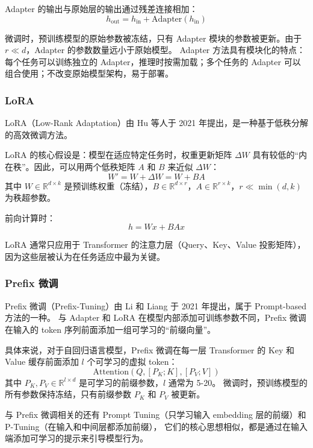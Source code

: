 Adapter 的输出与原始层的输出通过残差连接相加：
\begin{equation*}
	h_{\text{out}} = h_{\text{in}} + \text{Adapter}(h_{\text{in}})
\end{equation*}

微调时，预训练模型的原始参数被冻结，只有 Adapter 模块的参数被更新。由于 $r \ll d$，Adapter 的参数数量远小于原始模型。
Adapter 方法具有模块化的特点：每个任务可以训练独立的 Adapter，推理时按需加载；多个任务的 Adapter 可以组合使用；不改变原始模型架构，易于部署。

\subsubsection{LoRA}
LoRA（Low-Rank Adaptation）由 Hu 等人于 2021 年提出，是一种基于低秩分解的高效微调方法。

LoRA 的核心假设是：模型在适应特定任务时，权重更新矩阵 $\Delta W$ 具有较低的“内在秩”。因此，可以用两个低秩矩阵 $A$ 和 $B$ 来近似 $\Delta W$：
\begin{equation*}
	W' = W + \Delta W = W + BA
\end{equation*}
其中 $W \in \mathbb{R}^{d \times k}$ 是预训练权重（冻结），$B \in \mathbb{R}^{d \times r}$，$A \in \mathbb{R}^{r \times k}$，$r \ll \min(d, k)$ 为秩超参数。

前向计算时：
\begin{equation*}
	h = Wx + BAx
\end{equation*}

LoRA 通常只应用于 Transformer 的注意力层（Query、Key、Value 投影矩阵），因为这些层被认为在任务适应中最为关键。

\subsubsection{Prefix 微调}
Prefix 微调（Prefix-Tuning）由 Li 和 Liang 于 2021 年提出，属于 Prompt-based 方法的一种。
与 Adapter 和 LoRA 在模型内部添加可训练参数不同，Prefix 微调在输入的 token 序列前面添加一组可学习的“前缀向量”。

具体来说，对于自回归语言模型，Prefix 微调在每一层 Transformer 的 Key 和 Value 缓存前面添加 $l$ 个可学习的虚拟 token：
\begin{equation*}
	\text{Attention}(Q, [P_K; K], [P_V; V])
\end{equation*}
其中 $P_K, P_V \in \mathbb{R}^{l \times d}$ 是可学习的前缀参数，$l$ 通常为 5-20。
微调时，预训练模型的所有参数保持冻结，只有前缀参数 $P_K$ 和 $P_V$ 被更新。

与 Prefix 微调相关的还有 Prompt Tuning（只学习输入 embedding 层的前缀）和 P-Tuning（在输入和中间层都添加前缀），
它们的核心思想相似，都是通过在输入端添加可学习的提示来引导模型行为。

